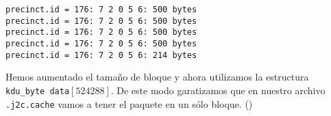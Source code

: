 \documentclass[11pt,a4paper]{article}
\begin{document}
\begin{verbatim}
precinct.id = 176: 7 2 0 5 6: 500 bytes
precinct.id = 176: 7 2 0 5 6: 500 bytes
precinct.id = 176: 7 2 0 5 6: 500 bytes
precinct.id = 176: 7 2 0 5 6: 500 bytes
precinct.id = 176: 7 2 0 5 6: 214 bytes
\end{verbatim}


Hemos aumentado el tama\~no de bloque y ahora utilizamos la estructura \texttt{kdu\_byte data$[524288]$}.
De este modo garatizamos que en nuestro archivo \texttt{.j2c.cache} vamos a tener el paquete en 
un s\'olo bloque. (\color{red}{Tengo que revisar cu\'al es el tama\~no m\'aximo que puede tener
un paquete})
\end{document}

